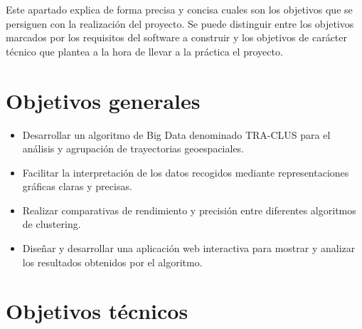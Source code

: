 
Este apartado explica de forma precisa y concisa cuales son los objetivos que se persiguen con la realización del proyecto. Se puede distinguir entre los objetivos marcados por los requisitos del software a construir y los objetivos de carácter técnico que plantea a la hora de llevar a la práctica el proyecto.

\section{Objetivos generales}\label{objetivos-generales}

\begin{itemize}
    \item Desarrollar un algoritmo de Big Data denominado TRA-CLUS para el análisis y agrupación de trayectorias geoespaciales.
    \item Facilitar la interpretación de los datos recogidos mediante representaciones gráficas claras y precisas.
    \item Realizar comparativas de rendimiento y precisión entre diferentes algoritmos de clustering.
    \item Diseñar y desarrollar una aplicación web interactiva para mostrar y analizar los resultados obtenidos por el algoritmo.
\end{itemize}

\section{Objetivos técnicos}\label{objetivos-tecnicos}

